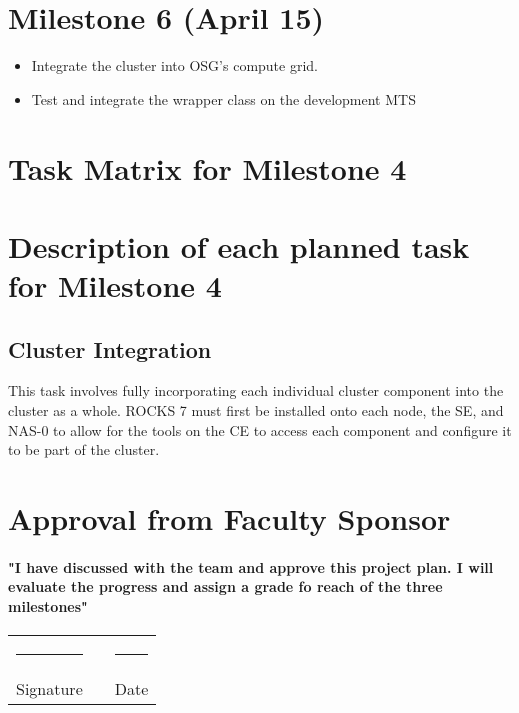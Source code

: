 \documentclass[12pt]{article}
\newcommand\tab[1][1cm]{\hspace*{#1}}
\newcommand{\doubleSignature}[2]{
	\begin{center}
		
	\end{center}
	\vspace{2cm}
	
	\noindent
	\begin{tabular}{lcl}
		\rule{7cm}{1pt} & \hspace{2cm} & \rule{3cm}{1pt} \\
		#1 & & #2
	\end{tabular}
	\vspace{1cm}
}
\begin{document}
\section{Milestone 6 (April 15)}
\begin{itemize}
  \item Integrate the cluster into OSG's compute grid.
  \item Test and integrate the wrapper class on the development MTS
\end{itemize}

\section{Task Matrix for Milestone 4}

\section{Description of each planned task for Milestone 4}

\subsection{Cluster Integration}
This task involves fully incorporating each individual cluster component into
the cluster as a whole. ROCKS 7 must first be installed onto each node, the SE,
and NAS-0 to allow for the tools on the CE to access each component and
configure it to be part of the cluster.

\section{Approval from Faculty Sponsor}
\paragraph{\tab "I have discussed with the team and approve this project plan. I will evaluate the progress and assign a grade fo reach of the three milestones"}
\doubleSignature{Signature}{Date}
\end{document}
